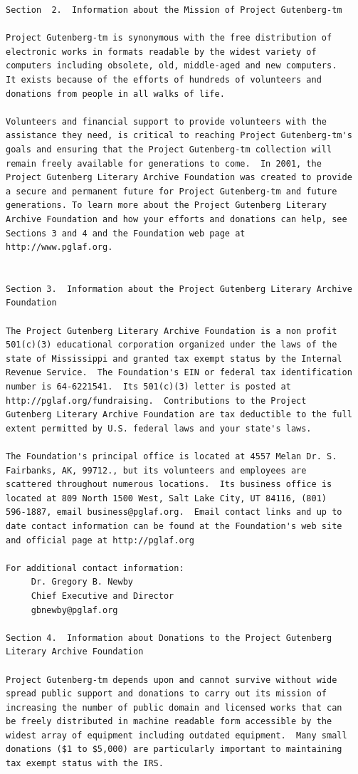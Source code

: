 \documentclass[a4paper,12pt]{book}[2004/02/16]
\theoremstyle{ilemma}
\theoremstyle{itheorem}
\theoremstyle{iother}
\theoremstyle{icorollary}
\theoremstyle{numcorollary}
\theoremstyle{idefinition}
\begin{document}
\begin{verbatim}
Section  2.  Information about the Mission of Project Gutenberg-tm

Project Gutenberg-tm is synonymous with the free distribution of
electronic works in formats readable by the widest variety of
computers including obsolete, old, middle-aged and new computers.
It exists because of the efforts of hundreds of volunteers and
donations from people in all walks of life.

Volunteers and financial support to provide volunteers with the
assistance they need, is critical to reaching Project Gutenberg-tm's
goals and ensuring that the Project Gutenberg-tm collection will
remain freely available for generations to come.  In 2001, the
Project Gutenberg Literary Archive Foundation was created to provide
a secure and permanent future for Project Gutenberg-tm and future
generations. To learn more about the Project Gutenberg Literary
Archive Foundation and how your efforts and donations can help, see
Sections 3 and 4 and the Foundation web page at
http://www.pglaf.org.


Section 3.  Information about the Project Gutenberg Literary Archive
Foundation

The Project Gutenberg Literary Archive Foundation is a non profit
501(c)(3) educational corporation organized under the laws of the
state of Mississippi and granted tax exempt status by the Internal
Revenue Service.  The Foundation's EIN or federal tax identification
number is 64-6221541.  Its 501(c)(3) letter is posted at
http://pglaf.org/fundraising.  Contributions to the Project
Gutenberg Literary Archive Foundation are tax deductible to the full
extent permitted by U.S. federal laws and your state's laws.

The Foundation's principal office is located at 4557 Melan Dr. S.
Fairbanks, AK, 99712., but its volunteers and employees are
scattered throughout numerous locations.  Its business office is
located at 809 North 1500 West, Salt Lake City, UT 84116, (801)
596-1887, email business@pglaf.org.  Email contact links and up to
date contact information can be found at the Foundation's web site
and official page at http://pglaf.org

For additional contact information:
     Dr. Gregory B. Newby
     Chief Executive and Director
     gbnewby@pglaf.org

Section 4.  Information about Donations to the Project Gutenberg
Literary Archive Foundation

Project Gutenberg-tm depends upon and cannot survive without wide
spread public support and donations to carry out its mission of
increasing the number of public domain and licensed works that can
be freely distributed in machine readable form accessible by the
widest array of equipment including outdated equipment.  Many small
donations ($1 to $5,000) are particularly important to maintaining
tax exempt status with the IRS.


\end{verbatim}
\end{document}
